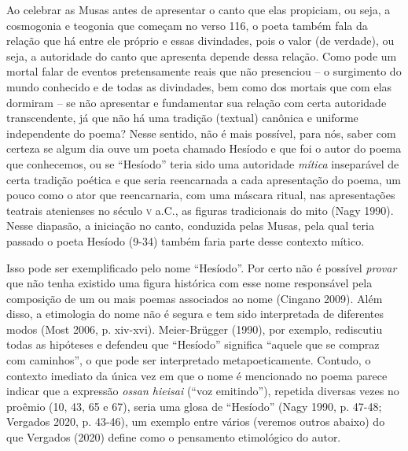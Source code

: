Ao celebrar as Musas antes de apresentar o canto que elas propiciam, ou
seja, a cosmogonia e teogonia que começam no verso 116, o poeta também
fala da relação que há entre ele próprio e essas divindades, pois o
valor (de verdade), ou seja, a autoridade do canto que apresenta depende
dessa relação. Como pode um mortal falar de eventos pretensamente reais
que não presenciou -- o surgimento do mundo conhecido e de todas as
divindades, bem como dos mortais que com elas dormiram -- se não
apresentar e fundamentar sua relação com certa autoridade transcendente,
já que não há uma tradição (textual) canônica e uniforme independente do
poema? Nesse sentido, não é mais possível, para nós, saber com certeza
se algum dia ouve um poeta chamado Hesíodo e que foi o autor do poema
que conhecemos, ou se ``Hesíodo'' teria sido uma autoridade
\emph{mítica} inseparável de certa tradição poética e que seria
reencarnada a cada apresentação do poema, um pouco como o ator que
reencarnaria, com uma máscara ritual, nas apresentações teatrais
atenienses no século \textsc{v} a.C., as figuras tradicionais do mito (Nagy
1990). Nesse diapasão, a iniciação no canto, conduzida pelas Musas, pela
qual teria passado o poeta Hesíodo (9-34) também faria parte desse
contexto mítico.

Isso pode ser exemplificado pelo nome ``Hesíodo''. Por certo não é
possível \emph{provar} que não tenha existido uma figura histórica com
esse nome responsável pela composição de um ou mais poemas associados ao
nome (Cingano 2009). Além disso, a etimologia do nome não é segura e tem
sido interpretada de diferentes modos (Most 2006, p. xiv-xvi).
Meier-Brügger (1990), por exemplo, rediscutiu todas as hipóteses e
defendeu que ``Hesíodo'' significa ``aquele que se compraz com
caminhos'', o que pode ser interpretado metapoeticamente. Contudo, o
contexto imediato da única vez em que o nome é mencionado no poema
parece indicar que a expressão \emph{ossan hieisai} (``voz emitindo''),
repetida diversas vezes no proêmio (10, 43, 65 e 67), seria uma glosa de
``Hesíodo'' (Nagy 1990, p. 47-48; Vergados 2020, p. 43-46), um exemplo
entre vários (veremos outros abaixo) do que Vergados (2020) define como
o pensamento etimológico do autor.


